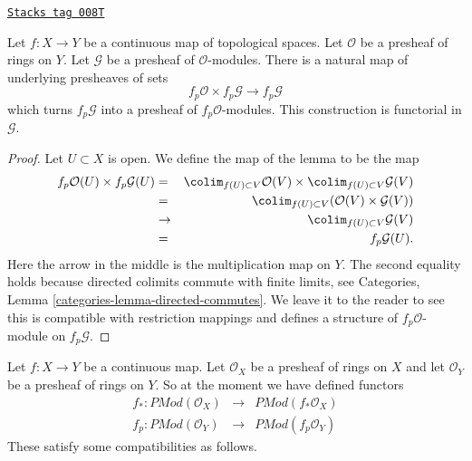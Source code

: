 \begin{lemma}
\label{sheaves-lemma-pullback-presheaf-module}
\href{https://stacks.math.columbia.edu/tag/008T}{\texttt{Stacks tag 008T}}

Let $f : X \to Y$ be a continuous map of topological spaces.
Let $\mathcal{O}$ be a presheaf of rings on $Y$. Let
$\mathcal{G}$ be a presheaf of $\mathcal{O}$-modules.
There is a natural map of underlying presheaves of sets
$$
f_p\mathcal{O} \times f_p\mathcal{G}
\longrightarrow
f_p\mathcal{G}
$$
which turns $f_p\mathcal{G}$ into a presheaf of $f_p\mathcal{O}$-modules.
This construction is functorial in $\mathcal{G}$.
\end{lemma}

\begin{proof}
Let $U \subset X$ is open. We define the map of the lemma
to be the map
\begin{eqnarray*}
f_p\mathcal{O}(U) \times f_p\mathcal{G}(U)
& = &
\colim_{f(U) \subset V} \mathcal{O}(V)
\times
\colim_{f(U) \subset V} \mathcal{G}(V) \\
& = &
\colim_{f(U) \subset V} (\mathcal{O}(V)\times \mathcal{G}(V)) \\
& \to &
\colim_{f(U) \subset V} \mathcal{G}(V) \\
& = &
f_p\mathcal{G}(U).
\end{eqnarray*}
Here the arrow in the middle is the multiplication map on $Y$.
The second equality holds because directed colimits commute
with finite limits, see
Categories, Lemma \ref{categories-lemma-directed-commutes}.
We leave it to the reader to see this is compatible with
restriction mappings and defines a structure of
$f_p\mathcal{O}$-module on $f_p\mathcal{G}$.
\end{proof}

Let $f : X \to Y$ be a continuous map.
Let $\mathcal{O}_X$ be a presheaf of rings on $X$ and
let $\mathcal{O}_Y$ be a presheaf of rings on $Y$.
So at the moment we have defined functors
\begin{eqnarray*}
f_* : \textit{PMod}(\mathcal{O}_X) &
\longrightarrow &
\textit{PMod}(f_*\mathcal{O}_X) \\
f_p : \textit{PMod}(\mathcal{O}_Y) &
\longrightarrow &
\textit{PMod}(f_p\mathcal{O}_Y)
\end{eqnarray*}
These satisfy some compatibilities as follows.

